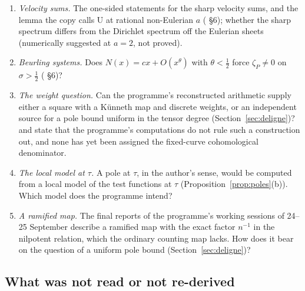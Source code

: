 \begin{enumerate}[label=\arabic*.,ref=\arabic*]
\item \emph{Velocity sums.} The one-sided statements for the sharp velocity sums, and the lemma the copy calls U at rational non-Eulerian $a$ ( §6); whether the sharp spectrum differs from the Dirichlet spectrum off the Eulerian sheets (numerically suggested at $a=2$, not proved).
\item \emph{Beurling systems.} Does $N(x)=cx+O(x^\theta)$ with $\theta<\tfrac12$ force $\zeta_P\ne0$ on $\sigma>\tfrac12$ ( §6)?
\item\label{q:weights} \emph{The weight question.} Can the programme's reconstructed arithmetic supply either a square with a Künneth map and discrete weights, or an independent source for a pole bound uniform in the tensor degree (Section~\ref{sec:deligne})?  and  state that the programme's computations do not rule such a construction out, and none has yet been assigned the fixed-curve cohomological denominator.
\item\label{q:tau} \emph{The local model at $\tau$.} A pole at $\tau$, in the author's sense, would be computed from a local model of the test functions at $\tau$ (Proposition~\ref{prop:poles}(b)). Which model does the programme intend?
\item \emph{A ramified map.} The final reports of the programme's working sessions of 24--25 September describe a ramified map with the exact factor $n^{-1}$ in the nilpotent relation, which the ordinary counting map lacks. How does it bear on the question of a uniform pole bound (Section~\ref{sec:deligne})?
\end{enumerate}

\subsection{What was not read or not re-derived}

